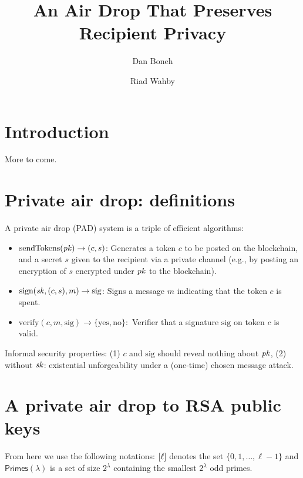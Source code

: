 \documentclass[11pt]{article}
\begin{document}
\title{An Air Drop That Preserves Recipient Privacy}
\author{Dan Boneh \and Riad Wahby}

\maketitle

\begin{abstract}
\end{abstract}

\section{Introduction}

More to come.


\section{Private air drop: definitions}


A private air drop (PAD) system is a triple of efficient algorithms:
\begin{itemize}
\item $\text{sendTokens}(\mathit{pk}) \to (c, s)$:
Generates a token $c$ to be posted on the blockchain,
and a secret $s$ given to the recipient via a private channel
(e.g., by posting an encryption of $s$ encrypted under $\mathit{pk}$ 
to the blockchain). 

\item $\text{sign}(\mathit{sk}, (c, s), m) \to \text{sig}$:
Signs a message $m$ indicating that the token $c$ is spent.

\item $\text{verify}(c, m, \text{sig}) \to \{\text{yes},\text{no}\}:$
Verifier that a signature $\text{sig}$ on token $c$ is valid.
\end{itemize}

Informal security properties: 
(1) $c$ and $\text{sig}$ should reveal nothing about $\mathit{pk}$,
(2) without $\mathit{sk}$: existential unforgeability under a 
(one-time) chosen message attack.



\section{A private air drop to RSA public keys}

From here we use the following notations:
$[{\ell}]$ denotes the set $\{0,1,\ldots,\ell-1\}$ and 
$\textsf{Primes}(\lambda)$ is a set of size $2^\lambda$ 
containing the smallest $2^\lambda$ odd primes. 
\end{document}
